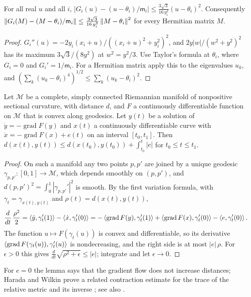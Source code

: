 \begin{lemma}\label{lem:quadratic}
For all real $u$ and all $i$,
$\bigl|G_i(u)-(u-\theta_i)/\mathsf m_i\bigr|\leq\frac{3\sqrt3}{16\,y_i^2}(u-\theta_i)^2$.
Consequently
$\left\lVert G_i(M)-(M-\theta_i)/\mathsf m_i\right\rVert\leq\frac{3\sqrt3}{16\,y_i^2}\left\lVert M-\theta_i\right\rVert^2$
for every Hermitian matrix $M$.
\end{lemma}

\begin{proof}
$G_i''(u)=-2y_i(x_i+u)/((x_i+u)^2+y_i^2)^2$, and
$2y|w|/(w^2+y^2)^2$ has its maximum $3\sqrt3/(8y^2)$ at $w^2=y^2/3$. Use
Taylor's formula at $\theta_i$, where $G_i=0$ and $G_i'=1/\mathsf m_i$. For a
Hermitian matrix apply this to the eigenvalues $u_k$, and
$(\sum_k(u_k-\theta_i)^4)^{1/2}\leq\sum_k(u_k-\theta_i)^2$.
\end{proof}

\begin{lemma}\label{lem:hadamard}
Let $\mathcal M$ be a complete, simply connected Riemannian manifold of
nonpositive sectional curvature, with distance $d$, and $F$ a continuously
differentiable function on $\mathcal M$ that is convex along geodesics. Let
$y(t)$ be a solution of $\dot y=-\operatorname{grad}F(y)$ and $x(t)$ a
continuously differentiable curve with
$\dot x=-\operatorname{grad}F(x)+e(t)$ on an interval $[t_0,t_1]$. Then
$d(x(t),y(t))\leq d(x(t_0),y(t_0))+\int_{t_0}^t|e|$ for $t_0\leq t\leq t_1$.
\end{lemma}

\begin{proof}
On such a manifold any two points $p,p'$ are joined by a unique geodesic
$\gamma_{p,p'}:[0,1]\to\mathcal M$, which depends smoothly on $(p,p')$, and
$d(p,p')^2=\int_0^1|\gamma_{p,p'}'|^2$ is smooth. By the first variation
formula, with $\gamma_t=\gamma_{x(t),y(t)}$ and $\rho(t)=d(x(t),y(t))$,
\[
 \frac d{dt}\,\frac{\rho^2}2=\left\langle\dot y,\gamma_t'(1)\right\rangle-\left\langle\dot x,\gamma_t'(0)\right\rangle
 =-\left\langle\operatorname{grad}F(y),\gamma_t'(1)\right\rangle+\left\langle\operatorname{grad}F(x),\gamma_t'(0)\right\rangle
 -\left\langle e,\gamma_t'(0)\right\rangle .
\]
The function $u\mapsto F(\gamma_t(u))$ is convex and differentiable, so its
derivative $\left\langle\operatorname{grad}F(\gamma_t(u)),\gamma_t'(u)\right\rangle$ is
nondecreasing, and the right side is at most $|e|\,\rho$. For
$\epsilon>0$ this gives $\frac d{dt}\sqrt{\rho^2+\epsilon}\leq|e|$; integrate
and let $\epsilon\to0$.
\end{proof}

For $e=0$ the lemma says that the gradient flow does not increase distances;
Harada and Wilkin prove a related contraction estimate for the trace of the relative metric and its inverse \cite[Theorem~3.18]{hw11}; see also \cite[\S5.3]{hkkp23}.

